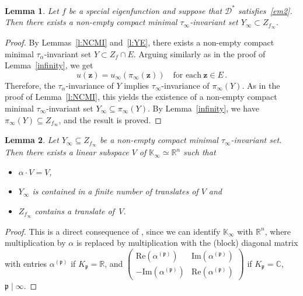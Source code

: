 \documentclass[12pt]{amsart}
\newtheorem{lemma}{Lemma}[section]
\theoremstyle{definition}
\theoremstyle{remark}
\numberwithin{equation}{section}
\begin{document}
\begin{lemma} \label{l:NCMIinfty}
Let $f$ be a special eigenfunction and suppose that $\mathcal{D}^*$ satisfies~\eqref{em2}.
Then there exists a non-empty compact minimal $\tau_\infty$-invariant set $Y_\infty \subset Z_{f_\infty}$.
\end{lemma}

\begin{proof}
By Lemmas~\ref{l:NCMI} and~\ref{l:YE}, there exists a non-empty compact minimal $\tau_\alpha$-invariant set $Y \subset Z_f \cap E$.
Arguing similarly as in the proof of Lemma~\ref{infinity}, we get
\begin{equation} \label{e:u}
u(\mathbf{z}) = u_\infty(\pi_\infty(\mathbf{z})) \quad \mbox{for each}\ \mathbf{z} \in E\,.
\end{equation}
Therefore, the $\tau_\alpha$-invariance of $Y$ implies $\tau_\infty$-invariance of $\pi_\infty(Y)$.
As in the proof of Lemma~\ref{l:NCMI}, this yields the existence of a non-empty compact minimal $\tau_\infty$-invariant set $Y_\infty \subseteq \pi_\infty(Y)$.
By Lemma~\ref{infinity}, we have $\pi_\infty(Y) \subseteq Z_{f_\infty}$, and the result is proved.
\end{proof}

\begin{lemma} \label{l:28}
Let $Y_\infty \subseteq Z_{f_\infty}$ be a non-empty compact minimal $\tau_\infty$-invariant set.
Then there exists a linear subspace $V$ of $\mathbb{K}_\infty \simeq \mathbb{R}^n$ such that
\begin{itemize}
\item
$\alpha \cdot V = V$,
\item
$Y_\infty$ is contained in a finite number of translates of $V$ and
\item
$Z_{f_\infty}$ contains a translate of~$V$.
\end{itemize}
\end{lemma}

\begin{proof}
This is a direct consequence of \cite[Theorem~2.8]{Cerveau-Conze-Raugi:96}, since we can identify $\mathbb{K}_\infty$ with $\mathbb{R}^n$, where multiplication by $\alpha$ is replaced by multiplication with the (block) diagonal matrix with entries $\alpha^{(\mathfrak{p})}$ if $K_\mathfrak{p} = \mathbb{R}$, and {\small$\begin{pmatrix}\mathrm{Re}(\alpha^{(\mathfrak{p})}) & \mathrm{Im}(\alpha^{(\mathfrak{p})}) \\ -\mathrm{Im}(\alpha^{(\mathfrak{p})}) & \mathrm{Re}(\alpha^{(\mathfrak{p})})\end{pmatrix}$} if $K_\mathfrak{p} = \mathbb{C}$, $\mathfrak{p} \mid \infty$.
\end{proof}
\end{document}
